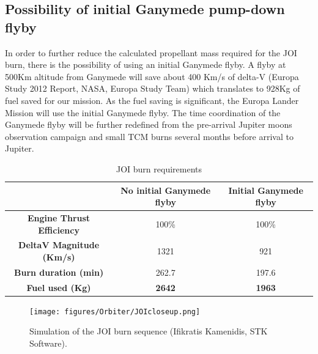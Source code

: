 \subsection*{Possibility of initial Ganymede pump-down flyby}
In order to further reduce the calculated propellant mass required for the JOI burn, there is the possibility of using an initial Ganymede flyby. A flyby at 500Km altitude from Ganymede will save about 400 Km/s of delta-V (Europa Study 2012 Report, NASA, Europa Study Team) 
which translates to 928Kg of fuel saved for our mission. As the fuel saving is significant, the Europa Lander Mission will use the initial Ganymede flyby. The time coordination of the Ganymede flyby will be further redefined from the pre-arrival Jupiter moons observation campaign and small TCM burns several months before arrival to Jupiter.
\begin{table}[htb]
  \centering
    \begin{tabular}{|c|c|c|}
    \hline
    \textbf{} & No initial Ganymede flyby & Initial Ganymede flyby \bigstrut\\
    \hline
    \textbf{Engine Thrust Efficiency} & 100\% & 100\% \bigstrut\\
    \hline
    \textbf{DeltaV Magnitude (Km/s)} & 1321  & 921 \bigstrut\\
    \hline
    \textbf{Burn duration (min)} & 262.7 & 197.6 \bigstrut\\
    \hline
    \textbf{Fuel used (Kg)} & \textbf{2642} & \textbf{1963} \bigstrut\\
    \hline
    \end{tabular}%
    \caption{JOI burn requirements}
  \label{tab:joi_burn}%
\end{table}%

\begin{figure}[htb]
\centering
\texttt{[image: figures/Orbiter/JOIcloseup.png]}
\caption{Simulation of the JOI burn sequence (Ifikratis Kamenidis, STK Software).}
\label{fig:joicloseup}
\end{figure}

